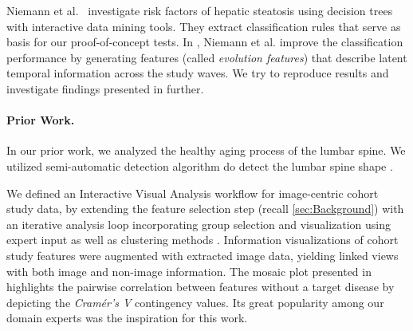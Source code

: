 \documentclass[journal]{style/vgtc} 			          %
\newcommand{\com}[1]{\textcolor{orange}{\uline{#1}}}
\begin{document}
Niemann et al.~\cite{Niemann2014} investigate risk factors of hepatic steatosis using decision trees with interactive data mining tools.
They extract classification rules that serve as basis for our proof-of-concept tests.
In \cite{Niemann2015}, Niemann et al. improve the classification performance by generating features (called \emph{evolution features}) that describe latent temporal information across the study waves.
We try to reproduce results and investigate findings presented in \cite{Niemann2014} further.

\paragraph{Prior Work.}
In our prior work, we analyzed the healthy aging process of the lumbar spine.
We utilized semi-automatic detection algorithm do detect the lumbar spine shape \cite{Klemm2013VMV}.

We defined an Interactive Visual Analysis workflow for image-centric cohort study data, by extending the feature selection step (recall \ref{sec:Background}) with an iterative analysis loop incorporating group selection and visualization using expert input as well as clustering methods \cite{Klemm2014VIS}.
Information visualizations of cohort study features were augmented with extracted image data, yielding linked views with both image and non-image information.
The mosaic plot presented in \cite{Klemm2014VIS} highlights the pairwise correlation between features without a target disease by depicting the \emph{Cram\'{e}r's V} contingency values.
Its great popularity among our domain experts was the inspiration for this work.
\end{document}
